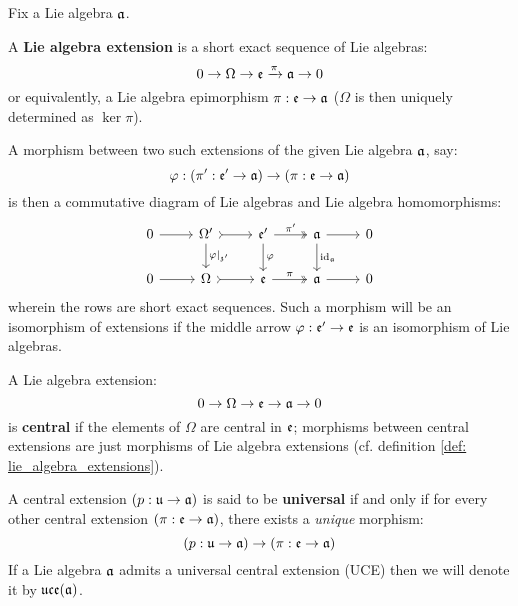         \begin{definition} \label{def: lie_algebra_extensions}
            Fix a Lie algebra $\mathfrak{a}$.
        
            A \textbf{Lie algebra extension} is a short exact sequence of Lie algebras:
                $$0 \to \Omega \to \mathfrak{e} \xrightarrow[]{\pi} \mathfrak{a} \to 0$$
            or equivalently, a Lie algebra epimorphism $\pi: \mathfrak{e} \to \mathfrak{a}$ ($\Omega$ is then uniquely determined as $\ker \pi$). 
            
            A morphism between two such extensions of the given Lie algebra $\mathfrak{a}$, say:
                $$\varphi: (\pi': \mathfrak{e}' \to \mathfrak{a}) \to (\pi: \mathfrak{e} \to \mathfrak{a})$$
            is then a commutative diagram of Lie algebras and Lie algebra homomorphisms:
                $$
                    \begin{tikzcd}
                	0 & {\Omega'} & {\frake'} & \a & 0 \\
                	0 & \Omega & \frake & \a & 0
                	\arrow["{\varphi|_{\z'}}", from=1-2, to=2-2]
                	\arrow["\varphi", from=1-3, to=2-3]
                	\arrow["{\id_{\a}}", from=1-4, to=2-4]
                	\arrow[from=1-1, to=1-2]
                	\arrow[tail, from=1-2, to=1-3]
                	\arrow["{\pi'}", two heads, from=1-3, to=1-4]
                	\arrow[from=1-4, to=1-5]
                	\arrow[from=2-1, to=2-2]
                	\arrow[tail, from=2-2, to=2-3]
                	\arrow["\pi", two heads, from=2-3, to=2-4]
                	\arrow[from=2-4, to=2-5]
                    \end{tikzcd}
                $$
            wherein the rows are short exact sequences. Such a morphism will be an isomorphism of extensions if the middle arrow $\varphi: \mathfrak{e}' \to \mathfrak{e}$ is an isomorphism of Lie algebras.
        \end{definition}
        \begin{definition} \label{def: central_lie_algebra_extensions}
            A Lie algebra extension:
                $$0 \to \Omega \to \mathfrak{e} \to \mathfrak{a} \to 0$$
            is \textbf{central} if the elements of $\Omega$ are central in $\mathfrak{e}$; morphisms between central extensions are just morphisms of Lie algebra extensions (cf. definition \ref{def: lie_algebra_extensions}).
            
            A central extension $(p: \mathfrak{u} \to \mathfrak{a})$ is said to be \textbf{universal} if and only if for every other central extension $(\pi: \mathfrak{e} \to \mathfrak{a})$, there exists a \textit{unique} morphism:
                $$(p: \mathfrak{u} \to \mathfrak{a}) \to (\pi: \mathfrak{e} \to \mathfrak{a})$$
            If a Lie algebra $\mathfrak{a}$ admits a universal central extension (UCE) then we will denote it by $\mathfrak{uce}(\mathfrak{a})$.
        \end{definition}

